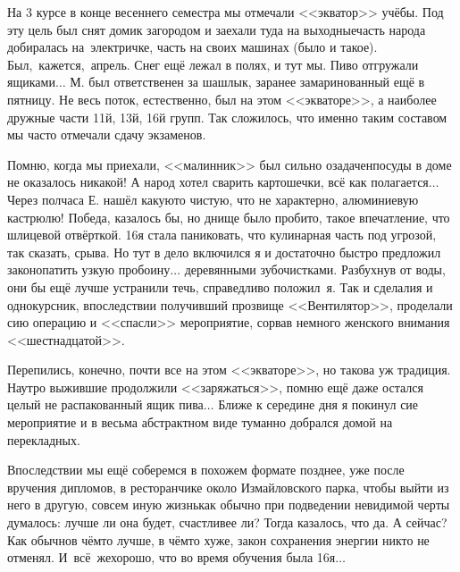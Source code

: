 На 3 курсе в конце весеннего семестра мы отмечали <<экватор>> учёбы. Под эту цель был снят домик загородом и заехали туда на выходные\mdash часть народа добиралась на~электричке, часть на своих машинах (было и такое). Был,~кажется,~апрель. Снег ещё лежал в полях, и тут мы. Пиво отгружали ящиками$\ldots$ М. был ответственен за шашлык, заранее замаринованный ещё в пятницу. Не весь поток, естественно, был на этом <<экваторе>>, а наиболее дружные части 11\sdash й, 13\sdash й, 16\sdash й групп. Так сложилось, что именно таким составом мы часто отмечали сдачу экзаменов.

Помню, когда мы приехали, <<малинник>> был сильно озадачен\mdash посуды в доме не оказалось никакой! А народ хотел сварить картошечки, всё как полагается$\ldots$ Через полчаса Е. нашёл какую\sdash то чистую, что не характерно, алюминиевую кастрюлю! Победа, казалось бы, но днище было пробито, такое впечатление, что шлицевой отвёрткой. 16\sdash я стала паниковать, что кулинарная часть под угрозой, так сказать, срыва. Но тут в дело включился я и достаточно быстро предложил законопатить узкую пробоину$\ldots$ деревянными зубочистками. Разбухнув от воды, они бы ещё лучше устранили течь, справедливо положил~я. Так и сделали\mdash я и однокурсник, впоследствии получивший прозвище <<Вентилятор>>, проделали сию операцию и <<спасли>> мероприятие, сорвав немного женского внимания <<шестнадцатой>>.

Перепились, конечно, почти все на этом <<экваторе>>, но такова уж традиция. Наутро выжившие продолжили <<заряжаться>>, помню ещё даже остался целый не распакованный ящик пива$\ldots$ Ближе к середине дня я покинул сие мероприятие и в весьма абстрактном виде туманно добрался домой на перекладных. 

Впоследствии мы ещё соберемся в похожем формате позднее, уже после вручения дипломов, в ресторанчике около Измайловского парка, чтобы выйти из него в другую, совсем иную жизнь\mdash как обычно при подведении невидимой черты думалось: лучше ли она будет, счастливее ли? Тогда казалось, что да. А сейчас? Как обычно\mdash в чём\sdash то лучше, в чём\sdash то хуже, закон сохранения энергии никто не отменял. И~всё~же\mdash хорошо, что во время обучения была 16\sdash я$\ldots$

\begin{center}
\end{center}